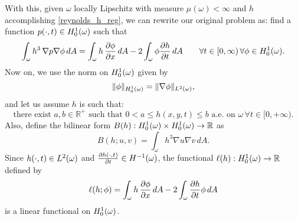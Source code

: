 With this, given $\omega$ locally Lipschitz with measure $\mu(\omega)<\infty$ and $h$ accomplishing \eqref*{reynolds_h_reg}, we can rewrite our original problem as: find a function $p(\cdot,t)\in {H_0^1(\omega)}$ such that
\begin{align}
\int_\omega h^3\,\nabla p \nabla \phi \,dA=\int_\omega h\, \parder{\phi}{x}\,dA-2 \int_\omega \phi\frac{\partial h }{\partial t}\,dA \qquad \forall t\in [0,\infty) \,\forall \phi\in \hzerooneom.\label{eq:reynolds_integral}
\end{align}
Now on, we use the norm on ${H_0^1(\omega)}$ given by $$\|\phi\|_{H_0^1(\omega)}=\|\nabla \phi\|_{L^{2}(\omega)},$$
and let us assume $h$ is such that:
\begin{equation}
\text{there exist }a,b\in \mathbb{R}^+\text{ such that }0<a\leq h(x,y,t)\leq b\text{ a.e. on }\omega\,\forall t\in [0,+\infty).\label{eq:hyp_h_reynolds}
\end{equation}
Also, define the bilinear form $B(h):{H_0^1(\omega)}\times{H_0^1(\omega)}\rightarrow \mathbb{R}$ as 
\begin{equation}
B(h;u,v)=\int_\omega h^3\nabla u\nabla v\,dA.\label{eq:def_B}
\end{equation}
Since $h(\cdot,t)\in {L^{2}(\omega)}$ and $\frac{\partial h(\cdot,t)}{\partial t}\in H^{-1}(\omega)$, the functional $\ell(h):{H_0^1(\omega)} \rightarrow\mathbb{R}$ defined by 
\begin{equation}
\ell (h;\phi)=\int_\omega h\,\parder{\phi}{x}\,dA-2 \int_\omega \frac{\partial h }{\partial t}\phi\,dA
\label{eq:def_ell}
\end{equation}
is a linear functional on ${H_0^1(\omega)}$.
